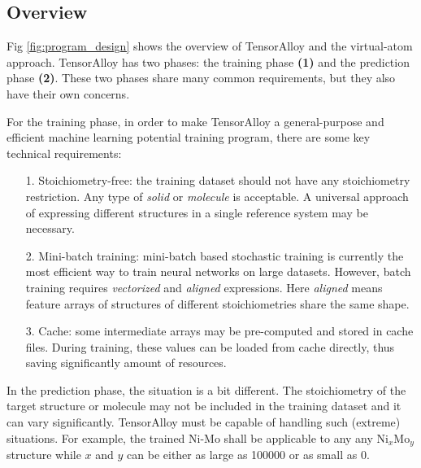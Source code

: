 \documentclass[final,1p,times]{elsarticle}
\begin{document}
% 
%
\subsection{Overview}
\label{section:overview}

Fig \ref{fig:program_design} shows the overview of TensorAlloy and the 
virtual-atom approach.
TensorAlloy has two phases: the training phase \textbf{(1)} and the prediction 
phase \textbf{(2)}. These two phases share many common requirements, but they 
also have their own concerns.

For the training phase, in order to make TensorAlloy a general-purpose and
efficient machine learning potential training program, there are some key 
technical requirements:
\begin{itemize}
    
    \item[1.] 
    Stoichiometry-free: the training dataset should not have any stoichiometry 
    restriction. Any type of \textit{solid} or \textit{molecule} is acceptable. 
    A universal approach of expressing different structures in a single 
    reference system may be necessary.
    
    \item[2.] 
    Mini-batch training: mini-batch based stochastic training is 
    currently the most efficient way to train neural networks on large datasets.
    However, batch training requires \textit{vectorized} and \textit{aligned} 
    expressions. Here \textit{aligned} means feature arrays of structures of 
    different stoichiometries share the same shape. 
    
    \item[3.] 
    Cache: some intermediate arrays may be pre-computed and stored in cache 
    files. During training, these values can be loaded from cache directly, thus 
    saving significantly amount of resources.

\end{itemize}

In the prediction phase, the situation is a bit different. The stoichiometry of 
the target structure or molecule may not be included in the training dataset and 
it can vary significantly. TensorAlloy must be capable of handling such 
(extreme) situations. For example, the trained Ni-Mo shall be applicable to any 
any $\mathrm{Ni}_{x}\mathrm{Mo}_{y}$ structure while $x$ and $y$ can be 
either as large as 100000 or as small as 0. 
\end{document}
